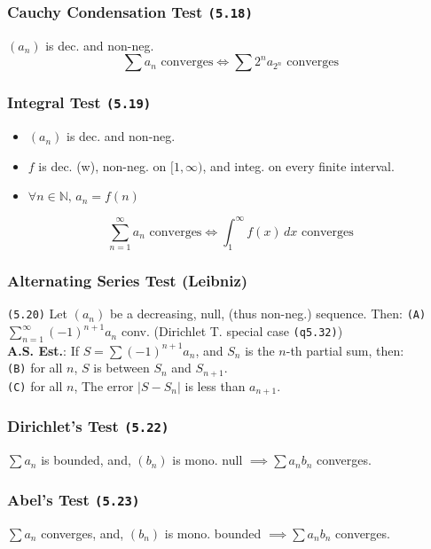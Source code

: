 \documentclass[a4paper,landscape]{article}
\newcommand{\tnum}[1]{{\color{gray}\footnotesize\texttt{(#1)}}}
\begin{document}
\begin{multicols}{2}
\subsubsection{Cauchy Condensation Test \tnum{5.18}}
$(a_n)$ is dec. and non-neg.
\[
\displaystyle\sum a_n \text{ converges} \displaystyle\iff\sum 2^na_{2^n} \text{ converges}
\]
\subsubsection{Integral Test \tnum{5.19}}
\begin{itemize}
    \item $(a_n)$ is dec. and non-neg.
    \item $f$ is dec. (w), non-neg. on $[1,\infty)$, and integ. on every finite interval. 
    \item $\forall n\in\mathbb{N},\,a_n=f(n)$
\end{itemize} \[ \displaystyle\sum_{n=1}^{\infty}a_n \text{ converges} \displaystyle\iff\int_{1}^{\infty} f(x) \, dx \text{ converges}
\]
\subsubsection{Alternating Series Test (Leibniz)}
\tnum{5.20} Let $(a_n)$ be a decreasing, null, (thus non-neg.) sequence. Then:
\tnum{A} $\sum_{n=1}^{\infty}(-1)^{n+1}a_n$ conv. (Dirichlet T. special case \tnum{q5.32}) \\
\textbf{A.S. Est.}: If $S=\sum (-1)^{n+1}a_n$, and $S_n$ is the $n$-th partial sum, then: \\
\tnum{B} for all $n$, $S$ is between $S_n$ and $S_{n+1}$. \\
\tnum{C} for all $n$, The error $|S-S_n|$ is less than $a_{n+1}$.
\subsubsection{Dirichlet's Test \tnum{5.22}}
$\sum a_n$ is bounded, and, $(b_n)$ is mono. null $\implies \sum a_nb_n$ converges.
\subsubsection{Abel's Test \tnum{5.23}}
$\sum a_n$ converges, and, $(b_n)$ is mono. bounded $\implies \sum a_nb_n$ converges.
\end{multicols}

\newpage
\end{document}
